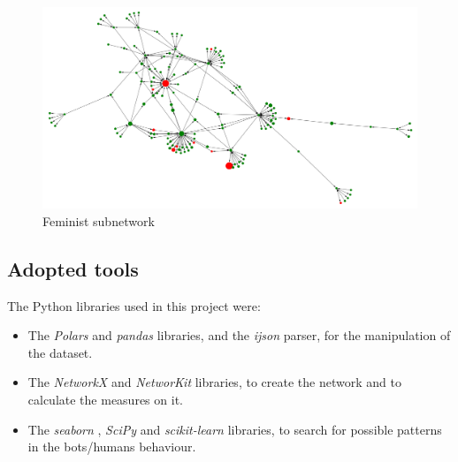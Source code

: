 \documentclass[12pt, a4paper]{article}
\begin{document}
		\begin{figure}[H]
    		\centering
    		\includegraphics[width=\textwidth]{feminist_subnetwork.png}
    		\caption{Feminist subnetwork}
    		\label{fig:feminist_subnetwork}
		\end{figure}
	\subsection{Adopted tools}
		The Python libraries used in this project were:
        \begin{itemize}
            \item The \textit{Polars} \cite{polars2025} and \textit{pandas} \cite{pandas2020} libraries, and the \textit{ijson} parser, for the manipulation of the dataset.
            \item The \textit{NetworkX} \cite{hagberg2008} and \textit{NetworKit} \cite{staudt2016} libraries, to create the network and to calculate the measures on it.
            \item The \textit{seaborn} \cite{seaborn2021}, \textit{SciPy} \cite{scipy2020} and \textit{scikit-learn} \cite{scikit-learn2011} libraries, to search for possible patterns in the bots/humans behaviour.
        \end{itemize}
		
\end{document}
